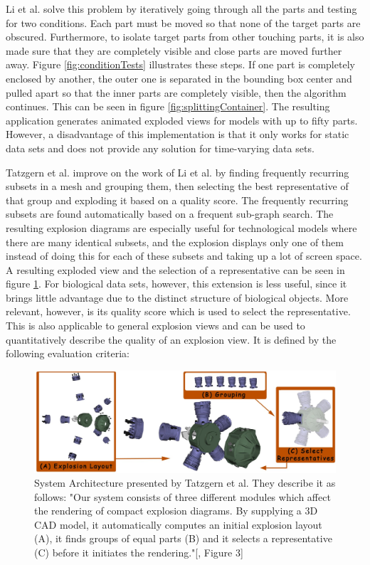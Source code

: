 Li et al. solve this problem by iteratively going through all the parts and testing for two conditions.
Each part must be moved so that none of the target parts are obscured. 
Furthermore, to isolate target parts from other touching parts, it is also made sure that they are completely visible and close parts are moved further away.
Figure \ref{fig:conditionTests} illustrates these steps.
If one part is completely enclosed by another, the outer one is separated in the bounding box center and pulled apart so that the inner parts are completely visible, then the algorithm continues. This can be seen in figure \ref{fig:splittingContainer}.
The resulting application generates animated exploded views for models with up to fifty parts. 
However, a disadvantage of this implementation is that it only works for static data sets and does not provide any solution for time-varying data sets.\cite{Wilmot_Li_2008}

Tatzgern et al. improve on the work of Li et al. by finding frequently recurring subsets in a mesh and grouping them, then selecting the best representative of that group and exploding it based on a quality score.
The frequently recurring subsets are found automatically based on a frequent sub-graph search.
The resulting explosion diagrams are especially useful for technological models where there are many identical subsets, and the explosion displays only one of them instead of doing this for each of these subsets and taking up a lot of screen space. 
A resulting exploded view and the selection of a representative can be seen in figure \ref{fig:tatzgern}.
For biological data sets, however, this extension is less useful, since it brings little advantage due to the distinct structure of biological objects.
More relevant, however, is its quality score which is used to select the representative. This is also applicable to general explosion views and can be used to quantitatively describe the quality of an explosion view. It is defined by the following evaluation criteria: 

\begin{figure}[t]
\centering
\includegraphics[width=.95\linewidth]{fig/Images/Tatzgern_fig3}
	\caption[]{System Architecture presented by Tatzgern et al. They describe it as follows: "Our system consists of three different modules which affect the rendering of compact explosion diagrams. By supplying a 3D CAD model, it automatically computes an initial explosion layout (A), it finds groups of equal parts (B) and it selects a representative (C) before it initiates the rendering."[\cite{Tatzgern_2010}, Figure 3]}
	\label{fig:tatzgern}
\end{figure}

